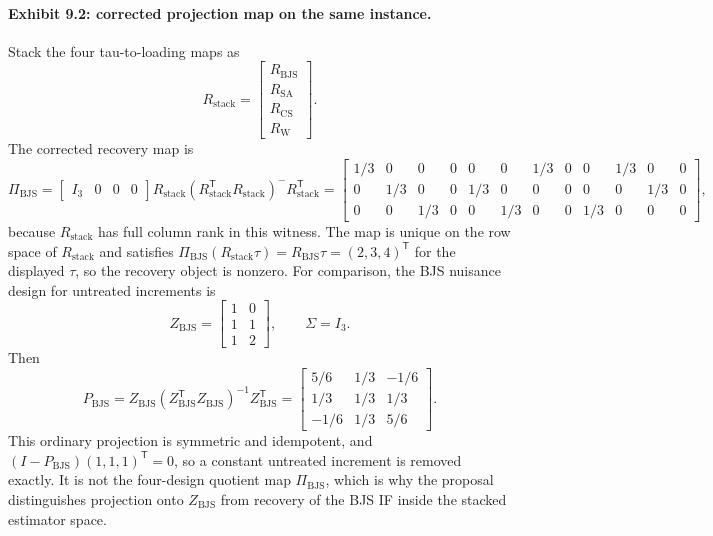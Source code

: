\documentclass[11pt]{article}
\newcommand{\transpose}{\mathsf{T}}
\newcommand{\R}{\mathbb{R}}
\theoremstyle{definition}
\theoremstyle{plain}
\theoremstyle{remark}
\begin{document}
\paragraph{Exhibit 9.2: corrected projection map on the same instance.}
Stack the four tau-to-loading maps as
\[
R_{\mathrm{stack}}=
\begin{bmatrix}
R_{\mathrm{BJS}}\\R_{\mathrm{SA}}\\R_{\mathrm{CS}}\\R_{\mathrm{W}}
\end{bmatrix}.
\]
The corrected recovery map is
\[
\Pi_{\mathrm{BJS}}=\begin{bmatrix}I_3&0&0&0\end{bmatrix}
R_{\mathrm{stack}}(R_{\mathrm{stack}}^\transpose R_{\mathrm{stack}})^{-}
R_{\mathrm{stack}}^\transpose
=
\begin{bmatrix}
1/3&0&0&0&0&0&1/3&0&0&1/3&0&0\\
0&1/3&0&0&1/3&0&0&0&0&0&1/3&0\\
0&0&1/3&0&0&1/3&0&0&1/3&0&0&0
\end{bmatrix},
\]
because \(R_{\mathrm{stack}}\) has full column rank in this witness. The map is
unique on the row space of \(R_{\mathrm{stack}}\) and satisfies
\(\Pi_{\mathrm{BJS}}(R_{\mathrm{stack}}\tau)=R_{\mathrm{BJS}}\tau=(2,3,4)^\transpose\)
for the displayed \(\tau\), so the recovery object is nonzero.
For comparison, the BJS nuisance design for untreated increments is
\[
Z_{\mathrm{BJS}}=
\begin{bmatrix}
1&0\\
1&1\\
1&2
\end{bmatrix},\qquad
\Sigma=I_3 .
\]
Then
\[
P_{\mathrm{BJS}}=Z_{\mathrm{BJS}}(Z_{\mathrm{BJS}}^\transpose Z_{\mathrm{BJS}})^{-1}
Z_{\mathrm{BJS}}^\transpose
=
\begin{bmatrix}
5/6&1/3&-1/6\\
1/3&1/3&1/3\\
-1/6&1/3&5/6
\end{bmatrix}.
\]
This ordinary projection is symmetric and idempotent, and
\((I-P_{\mathrm{BJS}})(1,1,1)^\transpose=0\), so a constant untreated increment
is removed exactly. It is not the four-design quotient map \(\Pi_{\mathrm{BJS}}\),
which is why the proposal distinguishes projection onto \(Z_{\mathrm{BJS}}\)
from recovery of the BJS IF inside the stacked estimator space.
\end{document}
